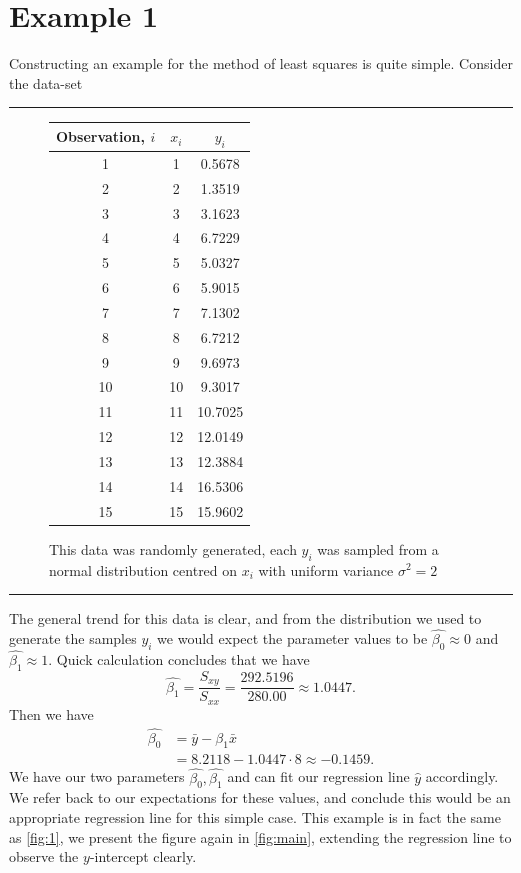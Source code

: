 \documentclass[10pt,a4paper, twocolumn, conference]{IEEEtran}
\begin{document}
\section{Example 1}
Constructing an example for the method of least squares is quite simple. Consider the data-set
\vspace{2mm}
\hrule
\begin{figure}[H]
\centering
\begin{tabular}{c|c|c}
Observation, $i$ & $x_i$ & $y_i$ \\
\hline
\hline
1 &1&0.5678 \\
2 &2&1.3519 \\
3 &3&3.1623 \\
4 &4&6.7229 \\
5 &5&5.0327 \\
6 &6&5.9015 \\
7 &7&7.1302 \\
8 &8&6.7212 \\
9 &9&9.6973 \\
10 &10&9.3017 \\
11 &11&10.7025 \\
12 &12&12.0149 \\
13 &13&12.3884 \\
14 &14& 16.5306\\
15 &15&15.9602 \\
\end{tabular}
\caption{\small{This data was randomly generated, each $y_i$ was sampled from a normal distribution centred on $x_i$ with uniform variance $\sigma^2 = 2$}}
\label{fig:dat}
\end{figure}
\hrule
\vspace{2mm}
The general trend for this data is clear, and from the distribution we used to generate the samples $y_i$ we would expect the parameter values to be $\hat{\beta_0} \approx 0$ and $\hat{\beta_1} \approx 1$. Quick calculation concludes that we have
\begin{equation}
\hat{\beta_1} = \frac{S_{xy}}{S_{xx}} = \frac{292.5196}{280.00} \approx 1.0447.
\end{equation}
Then we have
\begin{align} \nonumber
\hat{\beta_0} & = \bar{y} - \beta_1 \bar{x} \\
 & = 8.2118 - 1.0447 \cdot 8  \approx -0.1459.
\end{align}
We have our two parameters $\hat{\beta_0}, \hat{\beta_1}$ and can fit our regression line $\hat{y}$ accordingly. We refer back to our expectations for these values, and conclude this would be an appropriate regression line for this simple case. This example is in fact the same as \cref{fig:1}, we present the figure again in \cref{fig:main}, extending the regression line to observe the $y$-intercept clearly.
\end{document}
